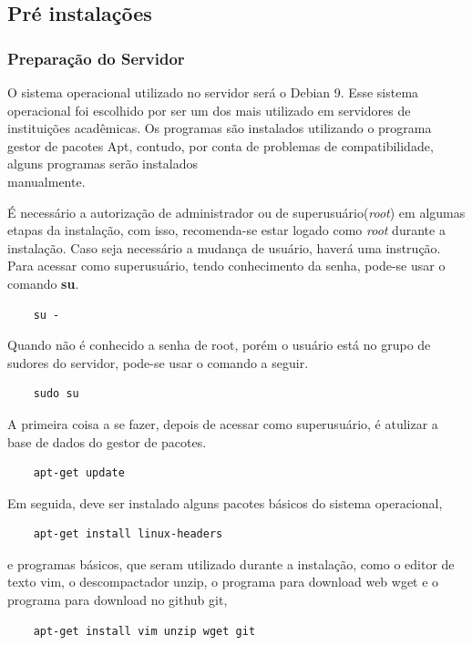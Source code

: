 \documentclass[12pt,hidelinks]{article}
\begin{document}
    \subsection{Pré instalações}

        \subsubsection{Preparação do Servidor}
        
            \qquad O sistema operacional utilizado no servidor será o Debian 9. Esse sistema operacional foi escolhido por ser um dos mais utilizado em servidores de instituições acadêmicas. Os programas são instalados utilizando o programa gestor de pacotes Apt, contudo, por conta de problemas de compatibilidade, alguns programas serão instalados \\manualmente.
            
            É necessário a autorização de administrador ou de superusuário(\textit{root}) em algumas etapas da instalação, com isso, recomenda-se estar logado como \textit{root} durante a instalação. Caso seja necessário a mudança de usuário, haverá uma instrução. Para acessar como superusuário, tendo conhecimento da senha, pode-se usar o comando \textbf{su}.
            \begin{verbatim}
    su -
            \end{verbatim}
            Quando não é conhecido a senha de root, porém o usuário está no grupo de sudores do servidor, pode-se usar o comando a seguir.
            \begin{verbatim}
    sudo su
            \end{verbatim}
            
            A primeira coisa a se fazer, depois de acessar como superusuário, é atulizar a base de dados do gestor de pacotes.

            \begin{verbatim}
    apt-get update
            \end{verbatim}
\newpage
            Em seguida, deve ser instalado alguns pacotes básicos do sistema operacional,
            \begin{verbatim}
    apt-get install linux-headers
            \end{verbatim}
            e programas básicos, que seram utilizado durante a instalação, como o editor de texto vim, o descompactador unzip, o programa para download web wget e o programa para download no github git,
            \begin{verbatim}
    apt-get install vim unzip wget git
            \end{verbatim}
            
\end{document}
